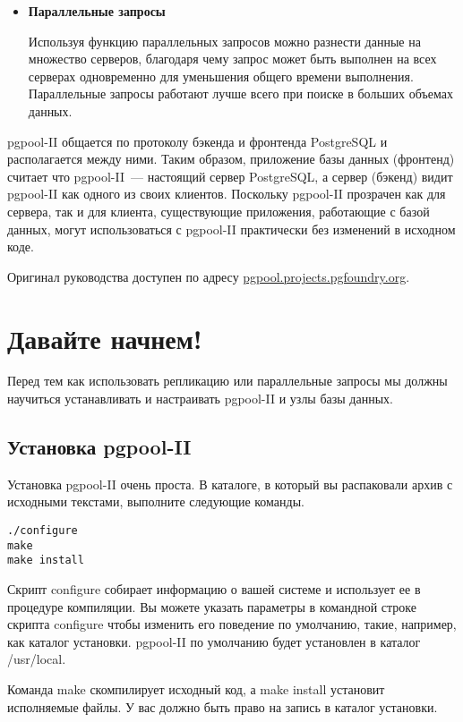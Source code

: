 \begin{itemize}
\item \textbf{Параллельные запросы}

Используя функцию параллельных запросов можно разнести данные на множество серверов, благодаря чему запрос может
быть выполнен на всех серверах одновременно для уменьшения общего времени выполнения. Параллельные запросы работают
лучше всего при поиске в больших объемах данных.
\end{itemize}

pgpool-II общается по протоколу бэкенда и фронтенда PostgreSQL и располагается между ними.
Таким образом, приложение базы данных (фронтенд) считает что pgpool-II~--- настоящий сервер PostgreSQL, а сервер (бэкенд)
видит pgpool-II как одного из своих клиентов. Поскольку pgpool-II прозрачен как для сервера, так и для клиента,
существующие приложения, работающие с базой данных, могут использоваться с pgpool-II практически без изменений в исходном коде.

Оригинал руководства доступен по адресу \href{http://pgpool.projects.pgfoundry.org/pgpool-II/doc/tutorial-en.html}{pgpool.projects.pgfoundry.org}.

\section{Давайте начнем!}
\label{sec:pgpool-II-begin}
Перед тем как использовать репликацию или параллельные запросы мы должны научиться устанавливать и настраивать pgpool-II
и узлы базы данных.

\subsection{Установка pgpool-II}
Установка pgpool-II очень проста. В каталоге, в который вы распаковали архив
с исходными текстами, выполните следующие команды.
\begin{lstlisting}[label=lst:pgpool1,caption=Установка pgpool-II]
./configure
make
make install
\end{lstlisting}

Скрипт configure собирает информацию о вашей системе и использует ее в процедуре компиляции. Вы можете
указать параметры в командной строке скрипта configure чтобы изменить его поведение по умолчанию, такие, например,
как каталог установки. pgpool-II по умолчанию будет установлен в каталог /usr/local.

Команда make скомпилирует исходный код, а make install установит исполняемые файлы. У вас должно быть право на
запись в каталог установки.

